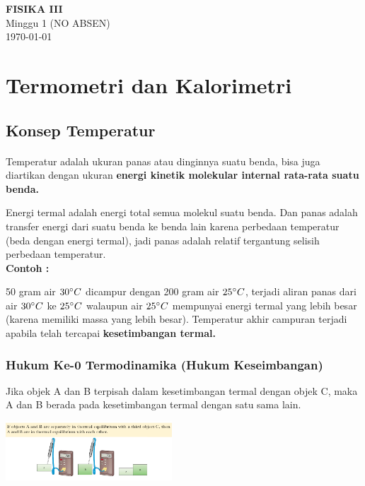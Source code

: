 \documentclass[twocolumn, 11pt]{article}%
\begin{document}
\begin{strip}
  \vspace*{\dimexpr-\stripsep}
  \begin{center}
      \Large\textbf{FISIKA III}\\
      \large{Minggu 1 (NO ABSEN)}\\
      \large{\today}\\
   \end{center}
\end{strip}

\section{Termometri dan Kalorimetri}
    \subsection{Konsep Temperatur}
        \paragraph{ } Temperatur adalah ukuran panas atau dinginnya suatu benda, bisa juga diartikan dengan ukuran \textbf{energi kinetik molekular internal rata-rata suatu benda.}

        Energi termal adalah energi total semua molekul suatu benda. Dan panas adalah transfer energi dari suatu benda ke benda lain karena perbedaan temperatur (beda dengan energi termal), jadi panas adalah relatif tergantung selisih perbedaan temperatur.\\

        \textbf{Contoh :}

        50 gram air $30\degree C$ dicampur dengan 200 gram air $25\degree C$, terjadi aliran panas dari air $30\degree C$ ke $25\degree C$ walaupun air $25\degree C$ mempunyai energi termal yang lebih besar (karena memiliki massa yang lebih besar). Temperatur akhir campuran terjadi apabila telah tercapai \textbf{kesetimbangan termal.}

        \subsubsection{Hukum Ke-0 Termodinamika (Hukum Keseimbangan)}
        Jika objek A dan B terpisah dalam kesetimbangan termal dengan objek C, maka A dan B berada pada kesetimbangan termal dengan satu sama lain.

        \begin{center}
            \includegraphics[width=235px]{1.png}
        \end{center}
\end{document}
